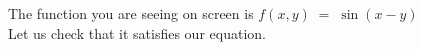\documentclass[preview]{standalone}
\begin{document}
\begin{center}
The function you are seeing on screen is $f(x, y)\;$$=\;$$\sin(x - y)$\\Let us check that it satisfies our equation.
\end{center}
\end{document}
